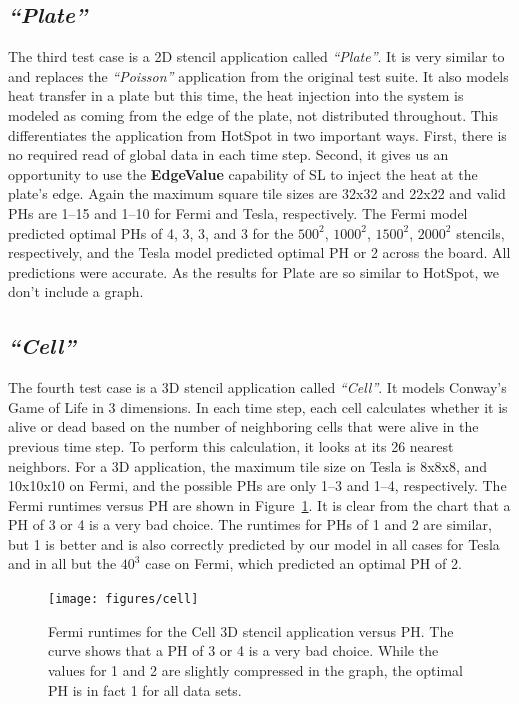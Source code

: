 \documentclass{sig-alternate}
\begin{document}
\subsection{\em ``Plate''}
The third test case is a 2D stencil application called {\em ``Plate''}.  It
is very similar to and replaces the {\em ``Poisson''} application from the
original test suite.  It also models heat transfer in a plate but this time,
the heat injection into the system is modeled as coming from the edge of the
plate, not distributed throughout.  This differentiates the application from
HotSpot in two important ways.  First, there is no required read of global
data in each time step.  Second, it gives us an opportunity to use the {\bf
  EdgeValue} capability of SL to inject the heat at the plate's edge.  Again
the maximum square tile sizes are 32x32 and 22x22 and valid PHs are 1--15 and
1--10 for Fermi and Tesla, respectively.  The Fermi model predicted optimal
PHs of 4, 3, 3, and 3 for the $500^2$, $1000^2$, $1500^2$, $2000^2$ stencils,
respectively, and the Tesla model predicted optimal PH or 2 across the board.
All predictions were accurate.  As the results for Plate are so similar to
HotSpot, we don't include a graph.

\subsection{\em ``Cell''}
The fourth test case is a 3D stencil application called {\em ``Cell''}.  It
models Conway's Game of Life in 3 dimensions.  In each time step, each cell
calculates whether it is alive or dead based on the number of neighboring
cells that were alive in the previous time step.  To perform this
calculation, it looks at its 26 nearest neighbors.  For a 3D application, the
maximum tile size on Tesla is 8x8x8, and 10x10x10 on Fermi, and the possible
PHs are only 1--3 and 1--4, respectively.  The Fermi runtimes versus PH are
shown in Figure~\ref{fig:cellTimes}.  It is clear from the chart that a PH of
3 or 4 is a very bad choice.  The runtimes for PHs of 1 and 2 are similar,
but 1 is better and is also correctly predicted by our model in all cases for
Tesla and in all but the $40^3$ case on Fermi, which predicted an optimal PH
of 2.
\begin{figure}
\texttt{[image: figures/cell]}
\caption{Fermi runtimes for the Cell 3D stencil application versus PH.  The
  curve shows that a PH of 3 or 4 is a very bad choice.  While the values for
  1 and 2 are slightly compressed in the graph, the optimal PH is in fact 1
  for all data sets.}
\label{fig:cellTimes}
\end{figure}
\end{document}
